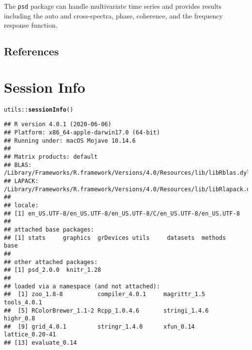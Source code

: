 \documentclass[11pt]{article}\usepackage[]{graphicx}\usepackage[]{color}
\makeatletter
\newcommand{\hlopt}[1]{\textcolor[rgb]{0,0,0}{#1}}%
\newcommand{\hlstd}[1]{\textcolor[rgb]{0.345,0.345,0.345}{#1}}%
\newcommand{\hlkwd}[1]{\textcolor[rgb]{0.737,0.353,0.396}{\textbf{#1}}}%
\newenvironment{kframe}{%
 \def\at@end@of@kframe{}%
 \ifinner\ifhmode%
  \def\at@end@of@kframe{\end{minipage}}%
  \begin{minipage}{\columnwidth}%
 \fi\fi%
 \def\FrameCommand##1{\hskip\@totalleftmargin \hskip-\fboxsep
 \colorbox{shadecolor}{##1}\hskip-\fboxsep
     \hskip-\linewidth \hskip-\@totalleftmargin \hskip\columnwidth}%
 \MakeFramed {\advance\hsize-\width
   \@totalleftmargin\z@ \linewidth\hsize
   \@setminipage}}%
 {\par\unskip\endMakeFramed%
 \at@end@of@kframe}
\newenvironment{knitrout}{}{} %
\newcommand{\Rcmd}[1]{\texttt{#1}}
\makeatother
\begin{document}
The \Rcmd{psd} package can handle multivariate time series and provides results including the auto and cross-spectra, phase, coherence, and the frequency response function.  


\subsection{References}


\section*{Session Info}
\begin{knitrout}
\color{fgcolor}\begin{kframe}
\begin{alltt}
\hlstd{utils}\hlopt{::}\hlkwd{sessionInfo}\hlstd{()}
\end{alltt}
\begin{verbatim}
## R version 4.0.1 (2020-06-06)
## Platform: x86_64-apple-darwin17.0 (64-bit)
## Running under: macOS Mojave 10.14.6
## 
## Matrix products: default
## BLAS:   /Library/Frameworks/R.framework/Versions/4.0/Resources/lib/libRblas.dylib
## LAPACK: /Library/Frameworks/R.framework/Versions/4.0/Resources/lib/libRlapack.dylib
## 
## locale:
## [1] en_US.UTF-8/en_US.UTF-8/en_US.UTF-8/C/en_US.UTF-8/en_US.UTF-8
## 
## attached base packages:
## [1] stats     graphics  grDevices utils     datasets  methods   base     
## 
## other attached packages:
## [1] psd_2.0.0  knitr_1.28
## 
## loaded via a namespace (and not attached):
##  [1] zoo_1.8-8          compiler_4.0.1     magrittr_1.5       tools_4.0.1       
##  [5] RColorBrewer_1.1-2 Rcpp_1.0.4.6       stringi_1.4.6      highr_0.8         
##  [9] grid_4.0.1         stringr_1.4.0      xfun_0.14          lattice_0.20-41   
## [13] evaluate_0.14
\end{verbatim}
\end{kframe}
\end{knitrout}



\end{document}
